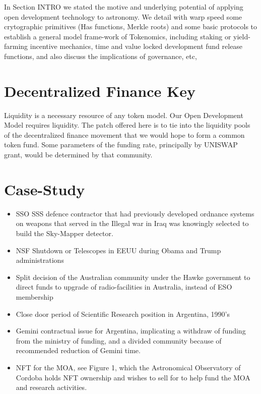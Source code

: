\documentclass[final,5p,times,twocolumn,authoryear]{elsarticle}
\begin{document}
In Section INTRO we stated the motive and underlying potential of applying open development technology to astronomy. We detail with warp speed some crytographic primitives (Has functions, Merkle roots) and some basic protocols to establish a general model frame-work of Tokenomics, including staking or yield-farming incentive mechanics, time and value locked development fund release functions, and also discuss the implications of governance, etc,

\section{Decentralized Finance Key}

Liquidity is a necessary resource of any token model. Our Open Development Model requires liquidity. The patch offered here is to tie into the liquidity pools of the decentralized finance movement that we would hope to form a common token fund. Some parameters of the funding rate, principally by UNISWAP grant, would be determined by that community.   

\section{Case-Study}
\label{sec:btc5}

\begin{itemize}
    \item{SSO SSS defence contractor that had previously developed ordnance systems on weapons that served in the Illegal war in Iraq was knowingly selected to build the Sky-Mapper detector. } 
    \item{NSF Shutdown or Telescopes in EEUU during Obama and Trump administrations}
    \item{Split decision of the Australian community under the Hawke government to direct funds to upgrade of radio-facilities in Australia, instead of ESO membership}
    \item{Close door period of Scientific Research position in Argentina, 1990's}
    \item{Gemini contractual issue for Argentina, implicating a withdraw of funding from the ministry of funding, and a divided community because of recommended reduction of Gemini time.}
    \item{NFT for the MOA}, see Figure 1, which the Astronomical Observatory of Cordoba holds NFT ownership and wishes to sell for to help fund the MOA and research activities. 

\end{itemize}
\end{document}
